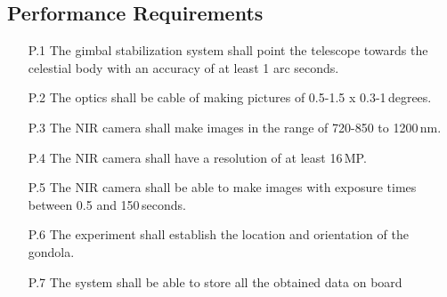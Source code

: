 \subsection{Performance Requirements}

\begin{enumerate}
    \item[P.1] The gimbal stabilization system shall point the telescope towards the celestial body with an accuracy of at least 1 arc seconds.
    \item[P.2] The optics shall be cable of making pictures of 0.5-1.5 x 0.3-1\,degrees.
    \item[P.3] The NIR camera shall make images in the range of 720-850 to 1200\,nm.
    \item[P.4] The NIR camera shall have a resolution of at least 16\,MP.
    \item[P.5] The NIR camera shall be able to make images with exposure times between 0.5 and 150\,seconds.
    \item[P.6] The experiment shall establish the location and orientation of the gondola.
    \item[P.7] The system shall be able to store all the obtained data on board

\end{enumerate}